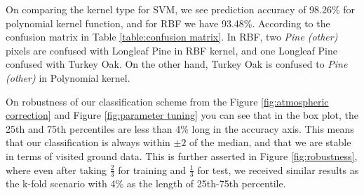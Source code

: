 \documentclass[remotesensing,article,accept,moreauthors,pdftex,12pt,a4paper]{mdpi}
\begin{document}
On comparing the kernel type for SVM, we see prediction accuracy of 98.26\% for polynomial kernel function, and for RBF we have 93.48\%. 
According to the confusion matrix in Table \ref{table:confusion matrix}. 
In RBF, two \textit{Pine (other)} pixels are confused with Longleaf Pine in RBF kernel, and one Longleaf Pine confused with Turkey Oak. 
On the other hand, Turkey Oak is confused to \textit{Pine (other)} in Polynomial kernel.





On robustness of our classification scheme from the Figure \ref{fig:atmospheric correction} and Figure \ref{fig:parameter tuning} you can see that in the box plot, the 25th and 75th percentiles are less than 4\% long in the accuracy axis. 
This means that our classification is always within $\pm 2$ of the median, and that we are stable in terms of visited ground data. 
This is further asserted in Figure \ref{fig:robustness}, where even after taking $\frac{2}{3}$ for training and $\frac{1}{3}$ for test, we received similar results as the k-fold scenario with 4\% as the length of 25th-75th percentile. 
\end{document}
